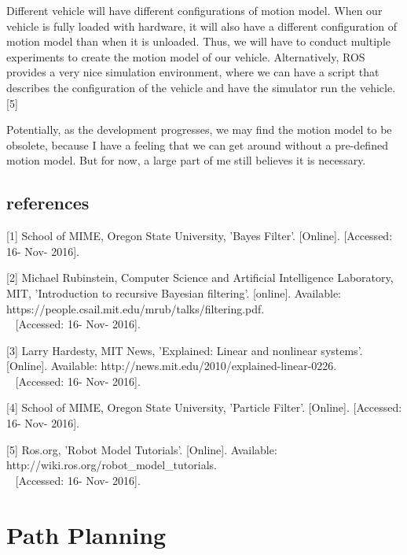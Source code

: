 \documentclass[compsoc,draftclsnofoot,onecolumn,10pt]{IEEEtran}
\begin{document}
Different vehicle will have different configurations of motion model. When our vehicle 
is fully loaded with hardware, it will also have a different configuration of motion 
model than when it is unloaded. Thus, we will have to conduct multiple experiments to 
create the motion model of our vehicle. Alternatively, ROS provides a very nice simulation 
environment, where we can have a script that describes the configuration of the vehicle 
and have the simulator run the vehicle. [5]\par

Potentially, as the development progresses, we may find the motion model to be obsolete, 
because I have a feeling that we can get around without a pre-defined motion model. But 
for now, a large part of me still believes it is necessary.\par

\subsection{references}
[1] School of MIME, Oregon State University, 'Bayes Filter'. [Online].
[Accessed: 16- Nov- 2016].\par

[2] Michael Rubinstein, Computer Science and Artificial Intelligence Laboratory, 
MIT, 'Introduction to recursive Bayesian filtering'. [online]. 
Available: https://people.csail.mit.edu/mrub/talks/filtering.pdf.\\~
[Accessed: 16- Nov- 2016].\par  

[3] Larry Hardesty, MIT News, 'Explained: Linear and nonlinear systems'. [Online].
Available: http://news.mit.edu/2010/explained-linear-0226.\\~
[Accessed: 16- Nov- 2016].\par

[4] School of MIME, Oregon State University, 'Particle Filter'. [Online].
[Accessed: 16- Nov- 2016].\par

[5] Ros.org, 'Robot Model Tutorials'. [Online].
Available: http://wiki.ros.org/robot\_model\_tutorials.\\~
[Accessed: 16- Nov- 2016].\par

\newpage

\section{Path Planning}
\end{document}
